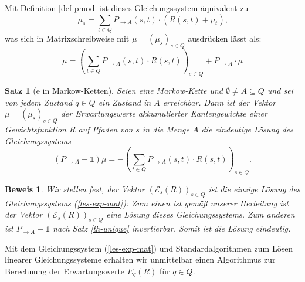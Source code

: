 \documentclass[a4paper]{article}
\newcommand{\mc}{Markow-Kette}
\newtheorem{satz}{Satz}[section] %
\theoremstyle{nonumberplain}
\newtheorem{beweis}{Beweis}
\begin{document}
Mit Definition \ref{def-pmod} ist dieses Gleichungssystem äquivalent zu
\begin{equation}
	\mu_s = \sum_{t \in Q}{ P_{\rightarrow A}(s,t) \cdot \left(R(s,t) + \mu_{t} \right) }\text{,}
\end{equation}
was sich in Matrixschreibweise mit $\mu = (\mu_s)_{s \in Q }$ ausdrücken lässt als:
\begin{equation}
\mu = \left(\sum_{t \in Q}{ P_{\rightarrow A}(s,t) \cdot R(s,t) }\right)_{s \in Q} + P_{\rightarrow A} \cdot \mu 
\end{equation}
\begin{satz}[\expect{}e in \mc{}n]\label{th-exp}
	Seien \mcex{} eine \mc{} und $\emptyset \neq A\subseteq Q$ und sei von jedem Zustand $q\in Q$ ein Zustand in $A$ erreichbar. Dann ist der Vektor $\mu = (\mu_s)_{s \in Q }$ der Erwartungswerte akkumulierter Kantengewichte einer Gewichtsfunktion $R$ auf Pfaden von $s$ in die Menge $A$ die eindeutige Lösung des Gleichungssystems	
	 \begin{equation}
	 (P_{\rightarrow A} - \mathbb{1}) \mu = - \left(\sum_{t \in Q}{ P_{\rightarrow A}(s,t) \cdot R(s,t) }\right)_{s \in Q}\text{.}\label{les-exp-mat}
	 \end{equation}
\end{satz}
\begin{beweis}
Wir stellen fest, der Vektor $(\mathcal{E}_{s}(R))_{s \in Q}$ ist die einzige Lösung des Gleichungssystems (\ref{les-exp-mat}):
Zum einen ist gemäß unserer Herleitung ist der Vektor $(\mathcal{E}_{s}(R))_{s \in Q}$ eine Lösung dieses Gleichungssystems. Zum anderen ist $P_{\rightarrow A} - \mathbb{1}$ nach Satz \ref{th-unique} invertierbar. Somit ist die Lösung eindeutig.
\end{beweis}

Mit dem Gleichungssystem (\ref{les-exp-mat}) und Standardalgorithmen zum Lösen linearer Gleichungssysteme erhalten wir unmittelbar einen Algorithmus zur Berechnung der Erwartungswerte $E_q(R)$ für $q \in Q$.
\end{document}
